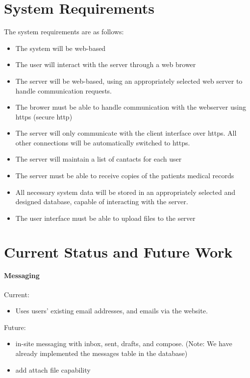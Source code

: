 \documentclass[12pt]{report}
\begin{document}
\chapter{System Requirements}
The system requirements are as follows:
\begin{itemize}
\item The system will be web-based
\item The user will interact with the server through a web brower
\item The server will be web-based, using an appropriately selected web server to handle communication requests.
\item The brower must be able to handle communication with the webserver using https (secure http)
\item The server will only communicate with the client interface over https.  All other connections will be automatically switched to https.
\item The server will maintain a list of cantacts for each user
\item The server must be able to receive copies of the patients medical records
\item All necessary system data will be stored in an appropriately selected and designed database, capable of interacting with the server.
\item The user interface must be able to upload files to the server
\end{itemize}

\chapter{Current Status and Future Work}

\subsubsection{Messaging}
Current: 
\begin{itemize}
\item Uses users' existing email addresses, and emails via the website. 
\end{itemize}
Future: 
\begin{itemize}
\item in-site messaging with inbox, sent, drafts, and compose. (Note: We have already implemented the messages table in the database)
\item add attach file capability
\end{itemize}
\end{document}
